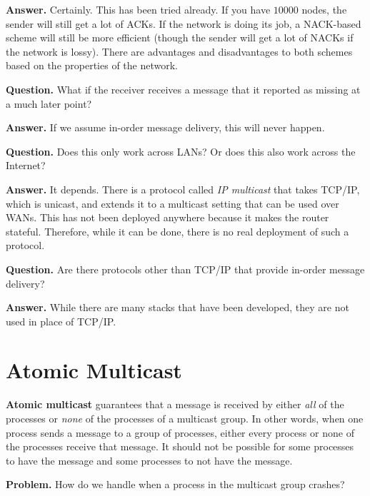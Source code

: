 \documentclass[twoside]{article}
\begin{document}
\textbf{Answer.} Certainly. This has been tried already. If you have $10000$ nodes, the sender will still get a lot of {\ttfamily ACK}s. If the network is doing its job, a NACK-based scheme will still be more efficient (though the sender will get a lot of {\ttfamily NACK}s if the network is lossy). There are advantages and disadvantages to both schemes based on the properties of the network.

\textbf{Question.} What if the receiver receives a message that it reported as missing at a much later point?

\textbf{Answer.} If we assume in-order message delivery, this will never happen. 

\textbf{Question.} Does this only work across LANs? Or does this also work across the Internet?

\textbf{Answer.} It depends. There is a protocol called \emph{IP multicast} that takes TCP/IP, which is unicast, and extends it to a multicast setting that can be used over WANs. This has not been deployed anywhere because it makes the router stateful. Therefore, while it can be done, there is no real deployment of such a protocol.

\textbf{Question.} Are there protocols other than TCP/IP that provide in-order message delivery?

\textbf{Answer.} While there are many stacks that have been developed, they are not used in place of TCP/IP.

\section{Atomic Multicast}

\textbf{Atomic multicast} guarantees that a message is received by either \emph{all} of the processes or \emph{none} of the processes of a multicast group. In other words, when one process sends a message to a group of processes, either every process or none of the processes receive that message. It should not be possible for some processes to have the message and some processes to not have the message.

\textbf{Problem.} How do we handle when a process in the multicast group crashes?
\end{document}
